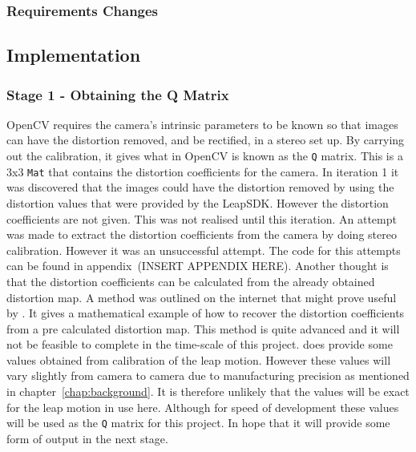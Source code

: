 \documentclass[11pt,oneside]{report}
\newcommand\code[1]{\texttt{#1}}
\begin{document}
			\subsubsection{Requirements Changes}
		\subsection{Implementation}
		\subsubsection{Stage 1 - Obtaining the Q Matrix}
			OpenCV requires the camera's intrinsic parameters to be known so that images can have the distortion removed, and be rectified, in a stereo set up.
			By carrying out the calibration, it gives what in OpenCV is known as the \code{Q} matrix.
			This is a 3x3 \code{Mat} that contains the distortion coefficients for the camera.
			In iteration 1 it was discovered that the images could have the distortion removed by using the distortion values that were provided by the LeapSDK.
			However the distortion coefficients are not given.
			This was not realised until this iteration.
			An attempt was made to extract the distortion coefficients from the camera by doing stereo calibration.
			However it was an unsuccessful attempt.
			The code for this attempts can be found in appendix~(INSERT APPENDIX HERE).
			Another thought is that the distortion coefficients can be calculated from the already obtained distortion map.
			A method was outlined on the internet that might prove useful by .
			It gives a mathematical example of how to recover the distortion coefficients from a pre calculated distortion map.
			This method is quite advanced and it will not be feasible to complete in the time-scale of this project.
			 does provide some values obtained from calibration of the leap motion.
			However these values will vary slightly from camera to camera due to manufacturing precision as mentioned in chapter~\ref{chap:background}.
			It is therefore unlikely that the values will be exact for the leap motion in use here.
			Although for speed of development these values will be used as the \code{Q} matrix for this project.
			In hope that it will provide some form of output in the next stage.
\end{document}
